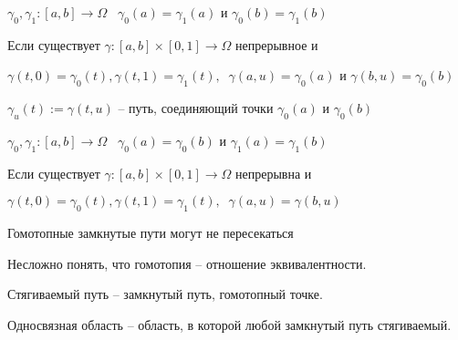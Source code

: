 
\begin{definition}\thmslashn
	
	$\gamma_0, \gamma_1:[a,b]\to \Omega \;\;\; \gamma_0(a) = \gamma_1(a)$ и $\gamma_0(b) = \gamma_1(b)$
	
	Если существует $\gamma:[a, b] \times [0, 1] \to \Omega$ непрерывное и
	
	$\gamma(t, 0) = \gamma_0(t), \gamma(t, 1) = \gamma_1(t), \;\;\gamma(a, u) = \gamma_0(a)$ и $\gamma(b, u) = \gamma_0(b)$
	
	$\gamma_u(t):= \gamma(t, u)$ -- путь, соединяющий точки $\gamma_0(a)$ и $\gamma_0(b)$
	
\end{definition}

\begin{definition}\thmslashn
	
	$\gamma_0, \gamma_1:[a,b]\to \Omega \;\;\; \gamma_0(a) = \gamma_0(b)$ и $\gamma_1(a) = \gamma_1(b)$
	
	Если существует $\gamma:[a, b] \times [0, 1] \to \Omega$ непрерывна и
	
	$\gamma(t, 0) = \gamma_0(t), \gamma(t, 1) = \gamma_1(t), \;\;\gamma(a, u) = \gamma(b, u)$
	
\end{definition}

\begin{remark_author}
	Гомотопные замкнутые пути могут не пересекаться
\end{remark_author}

Несложно понять, что гомотопия -- отношение эквивалентности.

\begin{definition}
	Стягиваемый путь -- замкнутый путь, гомотопный точке.
\end{definition}

\begin{definition}
	Односвязная область -- область, в которой любой замкнутый путь стягиваемый.
\end{definition}

